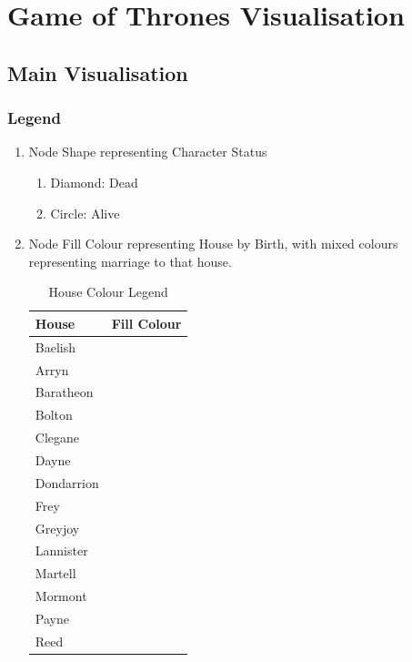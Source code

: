 \documentclass[twoside]{article}
\theoremstyle{definition}
\theoremstyle{definition}
\begin{document}
\newpage

\newpage

\newpage

\section{Game of Thrones Visualisation}
\subsection{Main Visualisation}
\subsubsection{Legend}
\begin{enumerate}
	\item Node Shape representing Character Status
		\begin{enumerate}
			\item Diamond: Dead
			\item Circle: Alive
		\end{enumerate}
	\item Node Fill Colour representing House by Birth, with mixed colours representing marriage to that house.
		\begin{table}[h!]
			\centering
			\caption{House Colour Legend}
				\begin{tabular}{ll}
				House       & Fill Colour              \\  \hline
			Baelish     & \cellcolor[HTML]{339966} \\
		Arryn       & \cellcolor[HTML]{66CCFF} \\
	Baratheon   & \cellcolor[HTML]{993300} \\
Bolton      & \cellcolor[HTML]{999999} \\
Clegane     & \cellcolor[HTML]{FFFF00} \\
Dayne       & \cellcolor[HTML]{CC99FF} \\
Dondarrion  & \cellcolor[HTML]{993366} \\
Frey        & \cellcolor[HTML]{3366FF} \\
Greyjoy     & \cellcolor[HTML]{C0C0C0} \\
Lannister   & \cellcolor[HTML]{FF0000} \\
Martell     & \cellcolor[HTML]{FF6600} \\
Mormont     & \cellcolor[HTML]{99CC00} \\
Payne       & \cellcolor[HTML]{FFFF99} \\
Reed        & \cellcolor[HTML]{99FF99} \\

\end{tabular}
\end{table}
\end{enumerate}
\end{document}
